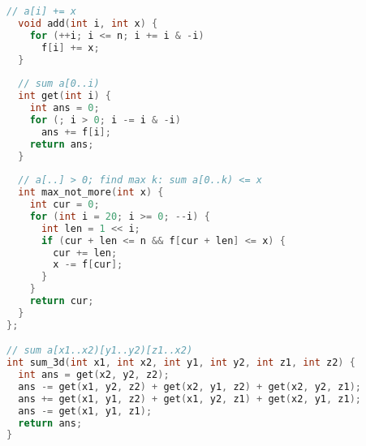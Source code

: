 \documentclass[9pt,a4paper,landscape,twosided]{extarticle}
\begin{document}
\begin{multicols*}{3}
\begin{lstlisting}[language=C++]
  // a[i] += x
  void add(int i, int x) {
    for (++i; i <= n; i += i & -i)
      f[i] += x;
  }
 
  // sum a[0..i)
  int get(int i) {
    int ans = 0;
    for (; i > 0; i -= i & -i)
      ans += f[i];
    return ans;
  }
 
  // a[..] > 0; find max k: sum a[0..k) <= x
  int max_not_more(int x) {
    int cur = 0;
    for (int i = 20; i >= 0; --i) {
      int len = 1 << i;
      if (cur + len <= n && f[cur + len] <= x) {
        cur += len;
        x -= f[cur];
      }
    }
    return cur;
  }
};

// sum a[x1..x2)[y1..y2)[z1..x2)
int sum_3d(int x1, int x2, int y1, int y2, int z1, int z2) {
  int ans = get(x2, y2, z2);
  ans -= get(x1, y2, z2) + get(x2, y1, z2) + get(x2, y2, z1);
  ans += get(x1, y1, z2) + get(x1, y2, z1) + get(x2, y1, z1);
  ans -= get(x1, y1, z1);
  return ans;
}
\end{lstlisting}


\end{multicols*}
\end{document}
